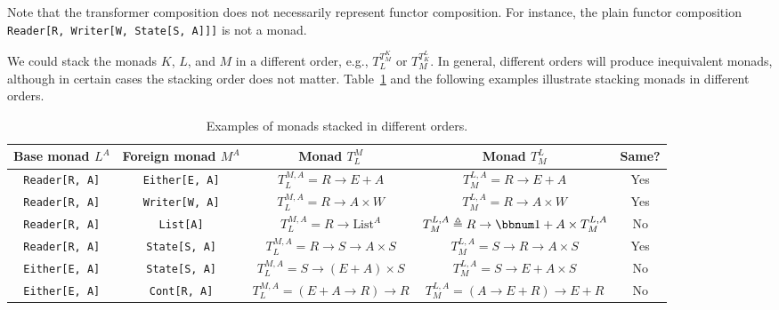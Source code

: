 Note that the transformer composition does not necessarily represent
functor composition. For instance, the plain functor composition \lstinline!Reader[R, Writer[W, State[S, A]]]!
is not a monad.

We could stack the monads $K$, $L$, and $M$ in a different order,
e.g., $T_{L}^{T_{M}^{K}}$ or $T_{M}^{T_{K}^{L}}$. In general, different
orders will produce inequivalent monads, although in certain cases
the stacking order does not matter. Table~\ref{tab:Examples-of-monad-stacks}
and the following examples illustrate stacking monads in different
orders.

\begin{table}

\begin{centering}
\begin{tabular}{|c|c|c|c|c|}
\hline 
\textbf{\small{}Base monad $L^{A}$} & \textbf{\small{}Foreign monad $M^{A}$} & \textbf{\small{}Monad $T_{L}^{M}$} & \textbf{\small{}Monad $T_{M}^{L}$} & \textbf{\small{}Same?}\tabularnewline
\hline 
\hline 
{\small{}}\lstinline!Reader[R, A]! & {\small{}}\lstinline!Either[E, A]! & {\small{}$T_{L}^{M,A}=R\rightarrow E+A$} & {\small{}$T_{M}^{L,A}=R\rightarrow E+A$} & {\small{}Yes}\tabularnewline
\hline 
{\small{}}\lstinline!Reader[R, A]! & {\small{}}\lstinline!Writer[W, A]! & {\small{}$T_{L}^{M,A}=R\rightarrow A\times W$} & {\small{}$T_{M}^{L,A}=R\rightarrow A\times W$} & {\small{}Yes}\tabularnewline
\hline 
{\small{}}\lstinline!Reader[R, A]! & {\small{}}\lstinline!List[A]! & {\small{}$T_{L}^{M,A}=R\rightarrow\text{List}^{A}$} & {\small{}$T_{M}^{L,A}\triangleq R\rightarrow\bbnum 1+A\times T_{M}^{L,A}$} & {\small{}No}\tabularnewline
\hline 
{\small{}}\lstinline!Reader[R, A]! & {\small{}}\lstinline!State[S, A]! & {\small{}$T_{L}^{M,A}=R\rightarrow S\rightarrow A\times S$} & {\small{}$T_{M}^{L,A}=S\rightarrow R\rightarrow A\times S$} & {\small{}Yes}\tabularnewline
\hline 
{\small{}}\lstinline!Either[E, A]! & {\small{}}\lstinline!State[S, A]! & {\small{}$T_{L}^{M,A}=S\rightarrow(E+A)\times S$} & {\small{}$T_{M}^{L,A}=S\rightarrow E+A\times S$} & {\small{}No}\tabularnewline
\hline 
{\small{}}\lstinline!Either[E, A]! & {\small{}}\lstinline!Cont[R, A]! & {\small{}$T_{L}^{M,A}=\left(E+A\rightarrow R\right)\rightarrow R$} & {\small{}$T_{M}^{L,A}=\left(A\rightarrow E+R\right)\rightarrow E+R$} & {\small{}No}\tabularnewline
\hline 
\end{tabular}
\par\end{centering}
\caption{\label{tab:Examples-of-monad-stacks}Examples of monads stacked in
different orders.}
\vspace{-0.6\baselineskip}

\end{table}


